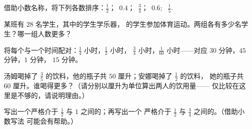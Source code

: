 \begin{exercise}[$\star$]\label{exo:g5:fractions:7}
借助小数名称，将下列各数排序：$\frac12$；\ $0.4$；\ $\frac34$；\
$0.6$; \ $\frac15$.
\end{exercise}

\begin{exercise}[$\star$]\label{exo:g5:fractions:8}
某班有 $28$ 名学生，其中的学生学乐器，
的学生参加体育运动。两组各有多少名学生？哪一组人数更多？
\end{exercise}

\begin{exercise}[$\star$]\label{exo:g5:fractions:9}
将每个与一个时间配对：$\frac14$ 小时，$\frac12$ 小时，
$\frac34$ 小时，$\frac{1}{60}$ 小时——对应 $30$ 分钟，$45$ 分钟，$1$ 分钟，
$15$ 分钟。
\end{exercise}

\begin{exercise}[$\star\star$]\label{exo:g5:fractions:10}
汤姆喝掉了 $\frac35$ 的饮料，他的瓶子共 $50$ 厘升；安娜喝掉了 $\frac12$ 的饮料，
她的瓶子共 $60$ 厘升。谁喝得更多？（请分别以厘升为单位算出两人的饮用量——
仅比较在这里是不够的，请说明理由。）
\end{exercise}

\begin{exercise}[$\star\star$]\label{exo:g5:fractions:11}
写出一个严格介于 $\frac12$ 与 $1$ 之间的；再写出一个
严格介于 $\frac12$ 与 $\frac34$ 之间的\omterm{def:g4:fractions:def}{分数}。（借助小数写法
可能会有帮助。）
\end{exercise}
